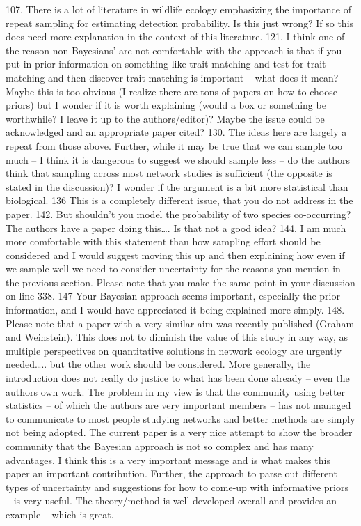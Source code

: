 107.  There is a lot of literature in wildlife ecology emphasizing the importance of repeat sampling for estimating detection probability.  Is this just wrong?  If so this does need more explanation in the context of this literature.
121.  I think one of the reason non-Bayesians’ are not comfortable with the approach is that if you put in prior information on something like trait matching and test for trait matching and then discover trait matching is important – what does it mean?  Maybe this is too obvious (I realize there are tons of papers on how to choose priors) but I wonder if it is worth explaining (would a box or something be worthwhile?  I leave it up to the authors/editor)?  Maybe the issue could be acknowledged and an appropriate paper cited?
130.  The ideas here are largely a repeat from those above.  Further, while it may be true that we can sample too much – I think it is dangerous to suggest we should sample less – do the authors think that sampling across most network studies is sufficient (the opposite is stated in the discussion)?  I wonder if the argument is a bit more statistical than biological.
136 This is a completely different issue, that you do not address in the paper.
142.  But shouldn’t you model the probability of two species co-occurring?  The authors have a paper doing this…. Is that not a good idea?
144.  I am much more comfortable with this statement than how sampling effort should be considered and I would suggest moving this up and then explaining how even if we sample well we need to consider uncertainty for the reasons you mention in the previous section.  Please note that you make the same point in your discussion on line 338.
147 Your Bayesian approach seems important, especially the prior information, and I would have appreciated it being explained more simply.
148.  Please note that a paper with a very similar aim was recently published (Graham and Weinstein).  This does not to diminish the value of this study in any way, as multiple perspectives on quantitative solutions in network ecology are urgently needed….. but the other work should be considered. More generally, the introduction does not really do justice to what has been done already – even the authors own work.  The problem in my view is that the community using better statistics – of which the authors are very important members – has not managed to communicate to most people studying networks and better methods are simply not being adopted.  The current paper is a very nice attempt to show the broader community that the Bayesian approach is not so complex and has many advantages.  I think this is a very important message and is what makes this paper an important contribution.  Further, the approach to parse out different types of uncertainty and suggestions for how to come-up with informative priors – is very useful.  The theory/method is well developed overall and provides an example – which is great.
